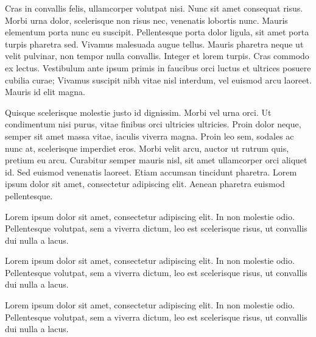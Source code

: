 \documentclass[12pt]{report}
\begin{document}
Cras in convallis felis, ullamcorper volutpat nisi. Nunc sit amet consequat risus. Morbi urna dolor, scelerisque non risus nec, venenatis lobortis nunc. Mauris elementum porta nunc eu suscipit. Pellentesque porta dolor ligula, sit amet porta turpis pharetra sed. Vivamus malesuada augue tellus. Mauris pharetra neque ut velit pulvinar, non tempor nulla convallis. Integer et lorem turpis. Cras commodo ex lectus. Vestibulum ante ipsum primis in faucibus orci luctus et ultrices posuere cubilia curae; Vivamus suscipit nibh vitae nisl interdum, vel euismod arcu laoreet. Mauris id elit magna.

Quisque scelerisque molestie justo id dignissim. Morbi vel urna orci. Ut condimentum nisi purus, vitae finibus orci ultricies ultricies. Proin dolor neque, semper sit amet massa vitae, iaculis viverra magna. Proin leo sem, sodales ac nunc at, scelerisque imperdiet eros. Morbi velit arcu, auctor ut rutrum quis, pretium eu arcu. Curabitur semper mauris nisl, sit amet ullamcorper orci aliquet id. Sed euismod venenatis laoreet. Etiam accumsan tincidunt pharetra. Lorem ipsum dolor sit amet, consectetur adipiscing elit. Aenean pharetra euismod pellentesque.

\cleardoublepage




\appendix


Lorem ipsum dolor sit amet, consectetur adipiscing elit. In non molestie odio. Pellentesque volutpat, sem a viverra dictum, leo est scelerisque risus, ut convallis dui nulla a lacus. 


Lorem ipsum dolor sit amet, consectetur adipiscing elit. In non molestie odio. Pellentesque volutpat, sem a viverra dictum, leo est scelerisque risus, ut convallis dui nulla a lacus. 


Lorem ipsum dolor sit amet, consectetur adipiscing elit. In non molestie odio. Pellentesque volutpat, sem a viverra dictum, leo est scelerisque risus, ut convallis dui nulla a lacus. 

\newpage
\end{document}
